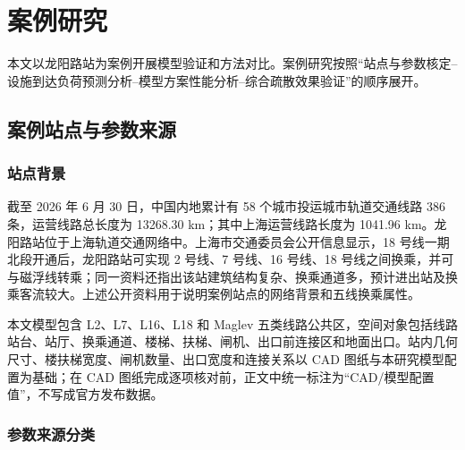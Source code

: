\documentclass[UTF8,a4paper,12pt]{ctexart}
\begin{document}
\section{案例研究}

本文以龙阳路站为案例开展模型验证和方法对比。案例研究按照“站点与参数核定--设施到达负荷预测分析--模型方案性能分析--综合疏散效果验证”的顺序展开。

\subsection{案例站点与参数来源}

\subsubsection{站点背景}

截至 2026 年 6 月 30 日，中国内地累计有 58 个城市投运城市轨道交通线路 386 条，运营线路总长度为 13268.30 km；其中上海运营线路长度为 1041.96 km。龙阳路站位于上海轨道交通网络中。上海市交通委员会公开信息显示，18 号线一期北段开通后，龙阳路站可实现 2 号线、7 号线、16 号线、18 号线之间换乘，并可与磁浮线转乘；同一资料还指出该站建筑结构复杂、换乘通道多，预计进出站及换乘客流较大。上述公开资料用于说明案例站点的网络背景和五线换乘属性。

本文模型包含 L2、L7、L16、L18 和 Maglev 五类线路公共区，空间对象包括线路站台、站厅、换乘通道、楼梯、扶梯、闸机、出口前连接区和地面出口。站内几何尺寸、楼扶梯宽度、闸机数量、出口宽度和连接关系以 CAD 图纸与本研究模型配置为基础；在 CAD 图纸完成逐项核对前，正文中统一标注为“CAD/模型配置值”，不写成官方发布数据。

\subsubsection{参数来源分类}
\end{document}
